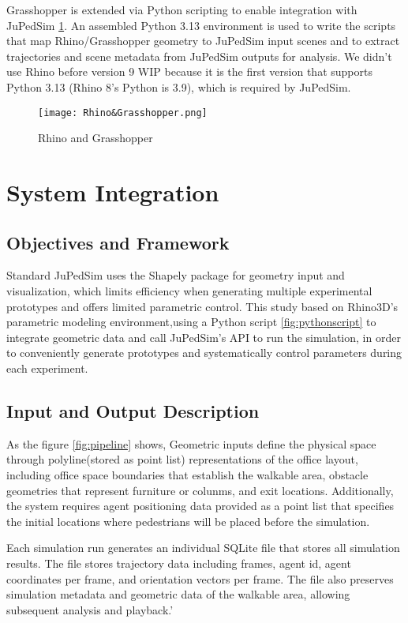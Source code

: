 Grasshopper is extended via Python scripting to enable integration with JuPedSim \ref{fig:rhinoandgrasshopper}. An assembled Python 3.13 environment is used to write the scripts that map Rhino/Grasshopper geometry to JuPedSim input scenes and to extract trajectories and scene metadata from JuPedSim outputs for analysis. We didn't use Rhino before version 9 WIP because it is the first version that supports Python 3.13 (Rhino 8's Python is 3.9), which is required by JuPedSim.

\begin{figure}
    \centering
    \texttt{[image: Rhino\&Grasshopper.png]}
    \caption{Rhino and Grasshopper}
    \label{fig:rhinoandgrasshopper}
\end{figure}

\section{System Integration}
\subsection{Objectives and Framework}
Standard JuPedSim uses the Shapely package for geometry input and visualization, which limits efficiency when generating multiple experimental prototypes and offers limited parametric control. This study based on Rhino3D's parametric modeling environment,using a Python script \ref{fig:pythonscript} to integrate geometric data and call JuPedSim's API to run the simulation, in order to conveniently generate prototypes and systematically control parameters during each experiment.

\subsection{Input and Output Description }
As the figure \ref{fig:pipeline} shows, Geometric inputs define the physical space through polyline(stored as point list) representations of the office layout, including office space boundaries that establish the walkable area, obstacle geometries that represent furniture or colunms, and exit locations. Additionally, the system requires agent positioning data provided as a point list that specifies the initial locations where pedestrians will be placed before the simulation. 

Each simulation run generates an individual SQLite file that stores all simulation results. The file stores trajectory data including frames, agent id, agent coordinates per frame, and orientation vectors per frame. The file also preserves simulation metadata and geometric data of the walkable area, allowing subsequent analysis and playback.'

